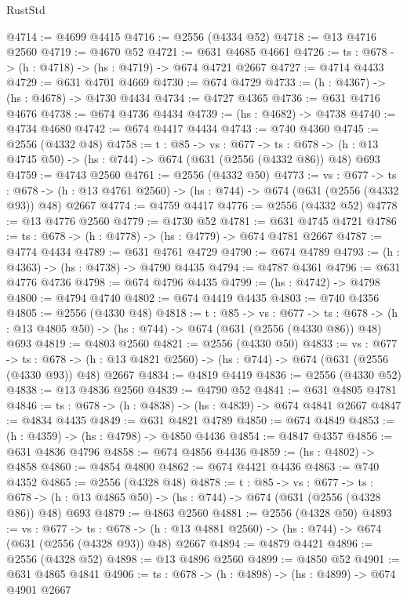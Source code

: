 \begin{lexlean}{RustStd}
\begin{coremodule}
@4714 := @4699 @4415
@4716 := @2556 (@4334 @52)
@4718 := @13 @4716 @2560
@4719 := @4670 @52
@4721 := @631 @4685 @4661
@4726 := {ts : @678} -> (h : @4718) -> (hs : @4719) -> @674 @4721 @2667
@4727 := @4714 @4433
@4729 := @631 @4701 @4669
@4730 := @674 @4729
@4733 := (h : @4367) -> (hs : @4678) -> @4730 @4434
@4734 := @4727 @4365
@4736 := @631 @4716 @4676
@4738 := @674 @4736 @4434
@4739 := (hs : @4682) -> @4738
@4740 := @4734 @4680
@4742 := @674 @4417 @4434
@4743 := @740 @4360
@4745 := @2556 (@4332 @48)
@4758 := {t : @85} ->
  {vs : @677} ->
  {ts : @678} -> (h : @13 @4745 @50) -> (hs : @744) -> @674 (@631 (@2556 (@4332 @86)) @48) @693
@4759 := @4743 @2560
@4761 := @2556 (@4332 @50)
@4773 := {vs : @677} ->
  {ts : @678} -> (h : @13 @4761 @2560) -> (hs : @744) -> @674 (@631 (@2556 (@4332 @93)) @48) @2667
@4774 := @4759 @4417
@4776 := @2556 (@4332 @52)
@4778 := @13 @4776 @2560
@4779 := @4730 @52
@4781 := @631 @4745 @4721
@4786 := {ts : @678} -> (h : @4778) -> (hs : @4779) -> @674 @4781 @2667
@4787 := @4774 @4434
@4789 := @631 @4761 @4729
@4790 := @674 @4789
@4793 := (h : @4363) -> (hs : @4738) -> @4790 @4435
@4794 := @4787 @4361
@4796 := @631 @4776 @4736
@4798 := @674 @4796 @4435
@4799 := (hs : @4742) -> @4798
@4800 := @4794 @4740
@4802 := @674 @4419 @4435
@4803 := @740 @4356
@4805 := @2556 (@4330 @48)
@4818 := {t : @85} ->
  {vs : @677} ->
  {ts : @678} -> (h : @13 @4805 @50) -> (hs : @744) -> @674 (@631 (@2556 (@4330 @86)) @48) @693
@4819 := @4803 @2560
@4821 := @2556 (@4330 @50)
@4833 := {vs : @677} ->
  {ts : @678} -> (h : @13 @4821 @2560) -> (hs : @744) -> @674 (@631 (@2556 (@4330 @93)) @48) @2667
@4834 := @4819 @4419
@4836 := @2556 (@4330 @52)
@4838 := @13 @4836 @2560
@4839 := @4790 @52
@4841 := @631 @4805 @4781
@4846 := {ts : @678} -> (h : @4838) -> (hs : @4839) -> @674 @4841 @2667
@4847 := @4834 @4435
@4849 := @631 @4821 @4789
@4850 := @674 @4849
@4853 := (h : @4359) -> (hs : @4798) -> @4850 @4436
@4854 := @4847 @4357
@4856 := @631 @4836 @4796
@4858 := @674 @4856 @4436
@4859 := (hs : @4802) -> @4858
@4860 := @4854 @4800
@4862 := @674 @4421 @4436
@4863 := @740 @4352
@4865 := @2556 (@4328 @48)
@4878 := {t : @85} ->
  {vs : @677} ->
  {ts : @678} -> (h : @13 @4865 @50) -> (hs : @744) -> @674 (@631 (@2556 (@4328 @86)) @48) @693
@4879 := @4863 @2560
@4881 := @2556 (@4328 @50)
@4893 := {vs : @677} ->
  {ts : @678} -> (h : @13 @4881 @2560) -> (hs : @744) -> @674 (@631 (@2556 (@4328 @93)) @48) @2667
@4894 := @4879 @4421
@4896 := @2556 (@4328 @52)
@4898 := @13 @4896 @2560
@4899 := @4850 @52
@4901 := @631 @4865 @4841
@4906 := {ts : @678} -> (h : @4898) -> (hs : @4899) -> @674 @4901 @2667

\end{coremodule}
\end{lexlean}
